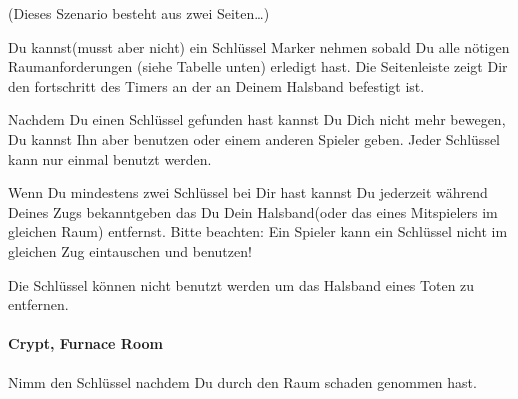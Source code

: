 

\vspace{2cm}
(Dieses Szenario besteht aus zwei Seiten…)
\newpage

  \begin{itemize}
        \bitem Du kannst(musst aber nicht) ein Schlüssel Marker nehmen sobald Du alle nötigen Raumanforderungen (siehe Tabelle unten) erledigt hast. Die Seitenleiste zeigt Dir den fortschritt des Timers an der an Deinem Halsband befestigt ist.

        \bitem Nachdem Du einen Schlüssel gefunden hast kannst Du Dich nicht mehr bewegen, Du kannst Ihn aber benutzen oder einem anderen Spieler geben. Jeder Schlüssel kann nur einmal benutzt werden.

        \bitem Wenn Du mindestens zwei Schlüssel bei Dir hast kannst Du jederzeit während Deines Zugs bekanntgeben das Du Dein Halsband(oder das eines Mitspielers im gleichen Raum) entfernst.
        Bitte beachten: Ein Spieler kann ein Schlüssel nicht im gleichen Zug eintauschen und benutzen!

        \bitem Die Schlüssel können nicht benutzt werden um das Halsband eines Toten zu entfernen.
    \end{itemize}

\paragraph{Crypt, Furnace Room} Nimm den Schlüssel nachdem Du durch den Raum schaden genommen hast.
